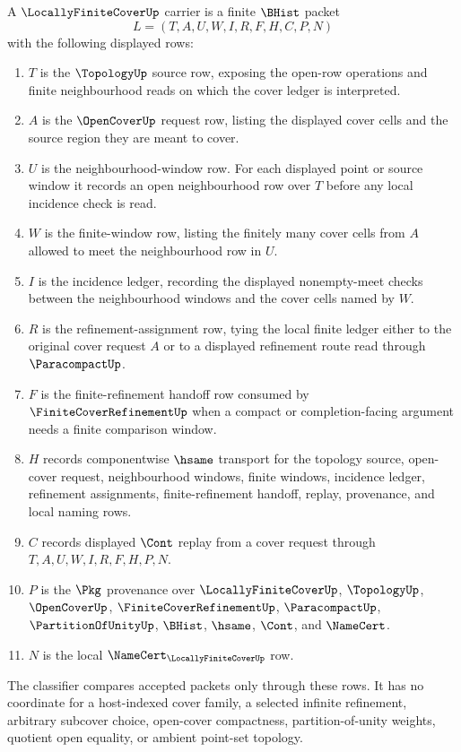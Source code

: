 \begin{definition}
\label{def:locally-finite-cover-carrier}
A $\LocallyFiniteCoverUp$ carrier is a finite $\BHist$ packet
$$
L=(T,A,U,W,I,R,F,H,C,P,N)
$$
with the following displayed rows:
\begin{enumerate}
\item $T$ is the $\TopologyUp$ source row, exposing the open-row operations and finite neighbourhood reads on which the cover ledger is interpreted.
\item $A$ is the $\OpenCoverUp$ request row, listing the displayed cover cells and the source region they are meant to cover.
\item $U$ is the neighbourhood-window row. For each displayed point or source window it records an open neighbourhood row over $T$ before any local incidence check is read.
\item $W$ is the finite-window row, listing the finitely many cover cells from $A$ allowed to meet the neighbourhood row in $U$.
\item $I$ is the incidence ledger, recording the displayed nonempty-meet checks between the neighbourhood windows and the cover cells named by $W$.
\item $R$ is the refinement-assignment row, tying the local finite ledger either to the original cover request $A$ or to a displayed refinement route read through $\ParacompactUp$.
\item $F$ is the finite-refinement handoff row consumed by $\FiniteCoverRefinementUp$ when a compact or completion-facing argument needs a finite comparison window.
\item $H$ records componentwise $\hsame$ transport for the topology source, open-cover request, neighbourhood windows, finite windows, incidence ledger, refinement assignments, finite-refinement handoff, replay, provenance, and local naming rows.
\item $C$ records displayed $\Cont$ replay from a cover request through $T,A,U,W,I,R,F,H,P,N$.
\item $P$ is the $\Pkg$ provenance over $\LocallyFiniteCoverUp$, $\TopologyUp$, $\OpenCoverUp$, $\FiniteCoverRefinementUp$, $\ParacompactUp$, $\PartitionOfUnityUp$, $\BHist$, $\hsame$, $\Cont$, and $\NameCert$.
\item $N$ is the local $\NameCert_{\LocallyFiniteCoverUp}$ row.
\end{enumerate}
The classifier compares accepted packets only through these rows. It has no coordinate for a host-indexed cover family, a selected infinite refinement, arbitrary subcover choice, open-cover compactness, partition-of-unity weights, quotient open equality, or ambient point-set topology.
\end{definition}

